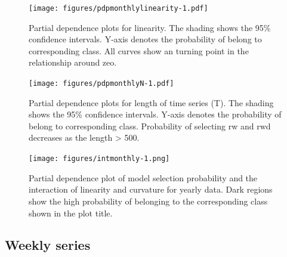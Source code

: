\documentclass[11pt,a4paper,]{article}
\begin{document}
\begin{figure}
\centering
\texttt{[image: figures/pdpmonthlylinearity-1.pdf]}
\caption{\label{fig:pdpmonthlylinearity}Partial dependence plots for linearity. The shading shows the 95\% confidence intervals. Y-axis denotes the probability of belong to corresponding class. All curves show an turning point in the relationship around zeo.}
\end{figure}

\begin{figure}
\centering
\texttt{[image: figures/pdpmonthlyN-1.pdf]}
\caption{\label{fig:pdpmonthlyN}Partial dependence plots for length of time series (T). The shading shows the 95\% confidence intervals. Y-axis denotes the probability of belong to corresponding class. Probability of selecting rw and rwd decreases as the length \textgreater{} 500.}
\end{figure}

\begin{figure}
\centering
\texttt{[image: figures/intmonthly-1.png]}
\caption{\label{fig:intmonthly}Partial dependence plot of model selection probability and the interaction of linearity and curvature for yearly data. Dark regions show the high probability of belonging to the corresponding class shown in the plot title.}
\end{figure}

\hypertarget{weekly-series}{%
\subsection{Weekly series}\label{weekly-series}}
\end{document}

